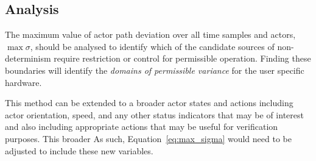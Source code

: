 \documentclass[letterpaper, 10 pt, journal, twoside]{IEEEtran}
\begin{document}
\subsection{Analysis}
The maximum value of actor path deviation over all time samples and actors, $\max\sigma$, should be analysed to identify which of the candidate sources of non-determinism require restriction or control for permissible operation. Finding these boundaries will identify the \textit{domains of permissible variance} for the user specific hardware.

This method can be extended to a broader actor states and actions including actor orientation, speed, and any other status indicators that may be of interest and also including appropriate actions that may be useful for verification purposes. This broader As such, Equation~\ref{eq:max_sigma} would need to be adjusted to include these new variables.





\end{document}
